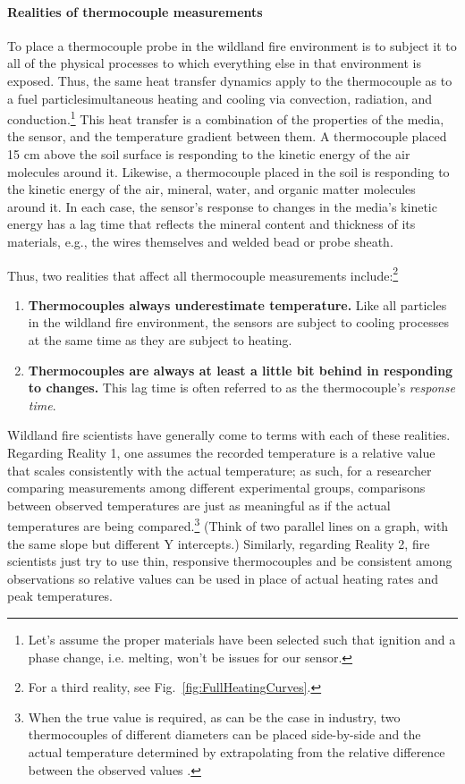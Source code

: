 \paragraph{Realities of thermocouple measurements}
To place a thermocouple probe in the wildland fire environment is to subject it to all of the physical processes to which everything else in that environment is exposed. 
Thus, the same heat transfer dynamics apply to the thermocouple as to a fuel particle\textemdash simultaneous heating and cooling via convection, radiation, and conduction.\footnote{Let's assume the proper materials have been selected such that ignition and a phase change, i.e. melting, won't be issues for our sensor.}
This heat transfer is a combination of the properties of the media, the sensor, and the temperature gradient between them. 
A thermocouple placed 15 cm above the soil surface is responding to the kinetic energy of the air molecules around it. 
Likewise, a thermocouple placed in the soil is responding to the kinetic energy of the air, mineral, water, and organic matter molecules around it.
In each case, the sensor's response to changes in the media's kinetic energy has a lag time that reflects the mineral content and thickness of its materials, e.g., the wires themselves and welded bead or probe sheath. 

Thus, two realities that affect all thermocouple measurements include:\footnote{
	For a third reality, see Fig.~\ref{fig:FullHeatingCurves}.} 
 \begin{enumerate}[noitemsep]
	\item \textbf{Thermocouples always underestimate temperature.} 
	Like all particles in the wildland fire environment, the sensors are subject to cooling processes at the same time as they are subject to heating. 
	\item \textbf{Thermocouples are always at least a little bit behind in responding to changes.} 
	This lag time is often referred to as the thermocouple's \emph{response time}. 
\end{enumerate}

Wildland fire scientists have generally come to terms with each of these realities.
Regarding Reality 1, one assumes the recorded temperature is a relative value that scales consistently with the actual temperature; as such, for a researcher comparing measurements among different experimental groups, comparisons between observed temperatures are just as meaningful as if the actual temperatures are being compared.\footnote{
	When the true value is required, as can be the case in industry, two thermocouples of different diameters can be placed side-by-side and the actual temperature determined by extrapolating from the relative difference between the observed values \citep{walker1968}.} 
(Think of two parallel lines on a graph, with the same slope but different Y intercepts.)
Similarly, regarding Reality 2, fire scientists just try to use thin, responsive thermocouples and be consistent among observations so relative values can be used in place of actual heating rates and peak temperatures. 

